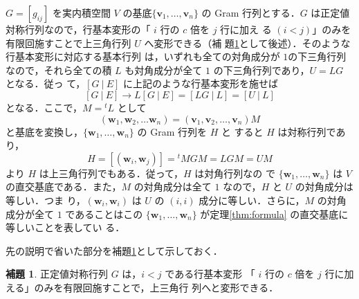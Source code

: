 \documentclass[11pt, uplatex, dvipdfmx]{jsarticle}
\theoremstyle{definition}
\newtheorem{lemma}{補題}
\begin{document}
$G=\left[ g_{ij}\right]$ を実内積空間 $V$
の基底$\{\bm{v}_1, \ldots, \bm{v}_n\}$ の Gram 行列とする．$G$ は正定値
対称行列なので，行基本変形の「 $i$ 行の $c$ 倍を $j$ 行に加え
る $(i<j)$」のみを有限回施すことで上三角行列 $U$ へ変形できる（補
題\ref{lem:rowadd}として後述）．そのような行基本変形に対応する基本行列
は，いずれも全ての対角成分が $1$の下三角行列なので，それら全ての積 $L$
も対角成分が全て $1$ の下三角行列であり，$U=LG$ となる．従っ
て，$\left[ G \ | \ E \right]$ に上記のような行基本変形を施せば
\[
  \left[ G \ | \ E\right] \to L\left[ G \ | \ E \right] = \left[ LG \
    |\ L \right] = \left[ U \ | \ L\right]
\]
となる．ここで，$M={}^{t}L$ として
\[
  \left( \bm{w}_1, \bm{w}_2, \ldots \bm{w}_n \right) = \left(
    \bm{v}_1, \bm{v}_2, \ldots, \bm{v}_n\right) M
\]
と基底を変換し，$\{\bm{w}_1, \ldots, \bm{w}_n\}$ の Gram 行列を $H$ と
すると $H$ は対称行列であり，
\[
  H=\left[ (\bm{w}_i, \bm{w}_j)\right] = {}^{t}M G M = L G M = U M
\]
より $H$ は上三角行列でもある．従って，$H$ は対角行列なの
で $\{\bm{w}_1, \ldots, \bm{w}_n\}$ は $V$ の直交基底である．また，$M$
の対角成分は全て $1$ なので，$H$ と $U$ の対角成分は等しい．つま
り，$(\bm{w}_i, \bm{w}_i)$ は $U$ の $(i,i)$ 成分に等しい．さらに，$M$
の対角成分が全て $1$ であることはこの $\{\bm{w}_1, \ldots,
\bm{w}_n\}$ が定理\ref{thm:formula} の直交基底に等しいことを表してい
る．

\newpage

先の説明で省いた部分を補題\ref{lem:rowadd}として示しておく．

\begin{lemma}\label{lem:rowadd}
  正定値対称行列 $G$ は，$i <j$ である行基本変形
  「 $i$ 行の $c$ 倍を $j$ 行に加える」のみを有限回施すことで，上三角行
  列へと変形できる．
\end{lemma}
\end{document}
